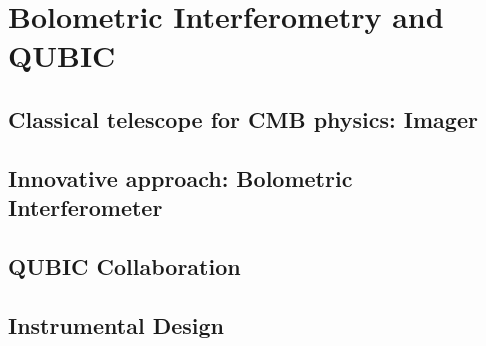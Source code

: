 \documentclass[../../thesis.tex]{subfiles}
\begin{document}
\chapter{Bolometric Interferometry and QUBIC}

\minitoc

\section{Classical telescope for CMB physics: Imager}

\section{Innovative approach: Bolometric Interferometer}

\section{QUBIC Collaboration}

\section{Instrumental Design}
\end{document}
